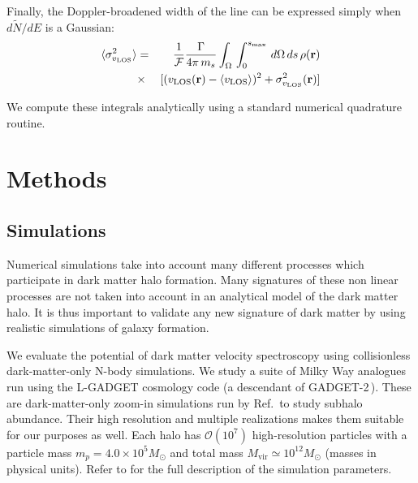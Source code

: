 \documentclass[aps,prd,10pt,twocolumn,superscriptaddress,showpacs]{revtex4-1}
\newcommand{\br}[0]{\mathbf{r}}
\newcommand{\los}[0]{\mathrm{LOS}}
\begin{document}
Finally, the Doppler-broadened width of the line can be expressed simply when $d\tilde{N}/dE$ is a Gaussian:
\begin{eqnarray}
	\langle \sigma_{v_\los}^2 \rangle &=& \frac{1}{\mathcal{F}}\frac{\Gamma}{4\pi \, m_s} 
	\int _\Omega \, \int _0 ^{s_{\rm max}}  \, d\Omega\,ds \, \rho(\br)\nonumber \\ 
	&\times&   [(v_\los(\br)-\langle v_\los\rangle)^2+\sigma_{v_\los}^2(\br)] 
\label{eq:lineshift}
\end{eqnarray}

We compute these integrals analytically using a standard numerical quadrature routine.



\section{Methods}

\subsection{Simulations}
\label{sec:simulations}

Numerical simulations take into account many different processes which participate in dark matter halo formation.  Many signatures of these non linear processes are not taken into account in an analytical model of the dark matter halo.  It is thus important to validate any new signature of dark matter by using realistic simulations of galaxy formation.

We evaluate the potential of dark matter velocity spectroscopy using collisionless dark-matter-only N-body
simulations.  We study a suite of Milky Way analogues run using the L-GADGET cosmology code (a
descendant of GADGET-2\,\cite{springel2005}). These are dark-matter-only zoom-in simulations run by
Ref.\,\cite{mao2015} to study subhalo abundance. Their high resolution and multiple realizations
makes them suitable for our purposes as well. Each halo has $\mathcal{O}(10^7)$ high-resolution
particles with a particle mass $m_p=4.0 \times 10^5 M_{\odot}$ and total  mass
$M_{\mathrm{vir}}\simeq 10^{12} M_{\odot}$ (masses in physical units). Refer to \cite{mao2015} for
the full description of the simulation parameters.
\end{document}
